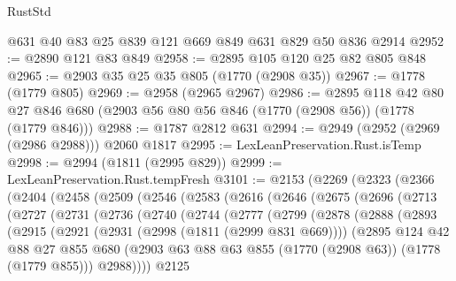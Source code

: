 \begin{lexlean}{RustStd}
\begin{coremodule}
    @631
    @40
    @83
    @25
    @839
    @121
    @669
    @849
    @631
    @829
    @50
    @836
    @2914
@2952 := @2890 @121 @83 @849
@2958 := @2895 @105 @120 @25 @82 @805 @848
@2965 := @2903 @35 @25 @35 @805 (@1770 (@2908 @35))
@2967 := @1778 (@1779 @805)
@2969 := @2958 (@2965 @2967)
@2986 := @2895
    @118
    @42
    @80
    @27
    @846
    @680
    (@2903 @56 @80 @56 @846 (@1770 (@2908 @56)) (@1778 (@1779 @846)))
@2988 := @1787 @2812 @631
@2994 := @2949 (@2952 (@2969 (@2986 @2988))) @2060 @1817
@2995 := LexLeanPreservation.Rust.isTemp
@2998 := @2994 (@1811 (@2995 @829))
@2999 := LexLeanPreservation.Rust.tempFresh
@3101 := @2153
    (@2269
      (@2323
        (@2366
          (@2404
            (@2458
              (@2509
                (@2546
                  (@2583
                    (@2616
                      (@2646
                        (@2675
                          (@2696
                            (@2713
                              (@2727
                                (@2731
                                  (@2736
                                    (@2740
                                      (@2744
                                        (@2777
                                          (@2799
                                            (@2878
                                              (@2888
                                                (@2893
                                                  (@2915
                                                    (@2921
                                                      (@2931 (@2998 (@1811 (@2999 @831 @669))))
                                                      (@2895
                                                        @124
                                                        @42
                                                        @88
                                                        @27
                                                        @855
                                                        @680
                                                        (@2903
                                                          @63
                                                          @88
                                                          @63
                                                          @855
                                                          (@1770 (@2908 @63))
                                                          (@1778 (@1779 @855)))
                                                        @2988))))
                                                @2125

\end{coremodule}
\end{lexlean}
